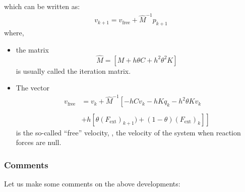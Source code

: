 which can be written as:
\begin{eqnarray}
  \label{eq:24}
   v_{k+1} = v_{\mathrm{free}}  + \widehat{M}^{-1} p_{k+1}
\end{eqnarray}
where,
\begin{itemize}
\item the matrix   
  \begin{equation}
\widehat{M} = \left[M+h\theta C + h^2 \theta^2 K \right]  \label{eq:2002}
\end{equation}
is usually called the iteration matrix.
\item The vector   
\begin{equation}
 \label{eq:2003}
\begin{array}{ll}
v_{\mathrm{free}}  & = v_{k} + \widehat{M}^{-1} \left[   - h  C v_{k} - h K q_{k} - h^2 \theta  K v_{k} \right. \\ \\ 
& \left. +  h\left[ \theta  (F_{\mathrm{ext}})_{k+1})+(1-\theta)  (F_{\mathrm{ext}})_{k} \right] \right] 
\end{array}
\end{equation}
%
is the so-called ``free'' velocity, \ie{}, the velocity of the system when reaction forces are null.     
\end{itemize}


\subsubsection{Comments} 

Let us make some  comments on the above developments: 

